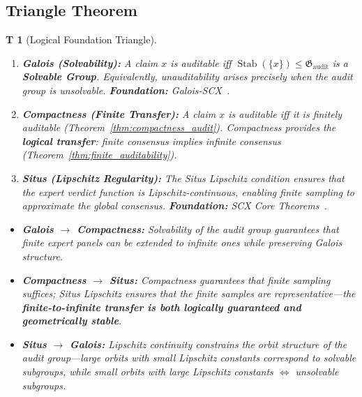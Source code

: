 \documentclass[12pt,a4paper]{article}
\newtheorem{theorem}Theorem[section]
\theoremstyle{remark}
\newcommand{\AuditGrp}{\mathfrak{G}_{\mathrm{audit}}}
\DeclareMathOperator{\Stab}{Stab}
\begin{document}
\subsection{Triangle Theorem}
\begin{theorem}[Logical Foundation Triangle]\label{thm:triangle}
\begin{enumerate}[label=\textbf{\arabic*: },itemsep=8pt,leftmargin=*]
    \item \textbf{Galois (Solvability):}
    A claim \(x\) is auditable iff \(\Stab(\{x\}) \leq \AuditGrp\) is a \textbf{Solvable Group}. Equivalently, unauditability arises precisely when the audit group is unsolvable. \textbf{Foundation:} Galois-SCX~\cite{scx_galois}.
    \item \textbf{Compactness (Finite Transfer):}
    A claim \(x\) is auditable iff it is finitely auditable (Theorem~\ref{thm:compactness_audit}). Compactness provides the \textbf{logical transfer}: finite consensus implies infinite consensus (Theorem~\ref{thm:finite_auditability}).
    \item \textbf{Situs (Lipschitz Regularity):}
    The Situs Lipschitz condition ensures that the expert verdict function is Lipschitz-continuous, enabling finite sampling to approximate the global consensus. \textbf{Foundation:} SCX Core Theorems~\cite{scx2026theorems}.
\end{enumerate}
\begin{itemize}[itemsep=3pt]
    \item \textbf{Galois \(\to\) Compactness:} Solvability of the audit group guarantees that finite expert panels can be extended to infinite ones while preserving Galois structure.
    \item \textbf{Compactness \(\to\) Situs:} Compactness guarantees that finite sampling suffices; Situs Lipschitz ensures that the finite samples are representative---the \textbf{finite-to-infinite transfer is both logically guaranteed and geometrically stable}.
    \item \textbf{Situs \(\to\) Galois:} Lipschitz continuity constrains the orbit structure of the audit group---large orbits with small Lipschitz constants correspond to solvable subgroups, while small orbits with large Lipschitz constants \(\iff\) unsolvable subgroups.
\end{itemize}
\end{theorem}
\end{document}
